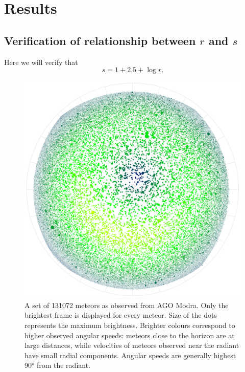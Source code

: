\section{Results}
    \subsection{Verification of relationship between $r$ and $s$}
        Here we will verify that
        \begin{equation}
            s = 1 + \num{2.5} + \log r.
        \end{equation}

    \begin{figure}[h]
        \includegraphics[width = \linewidth]{pictures/angularSpeed-ago.png}
        \caption{A set of 131072 meteors as observed from AGO Modra. Only the brightest frame is displayed for every meteor.
            Size of the dots represents the maximum brightness. Brighter colours correspond to higher observed angular speeds:
            meteors close to the horizon are at large distances, while velocities of meteors observed near the radiant have
            small radial components. Angular speeds are generally highest \ang{90} from the radiant.}
        \label{sim:res:as:as-ago}
    \end{figure}
    
